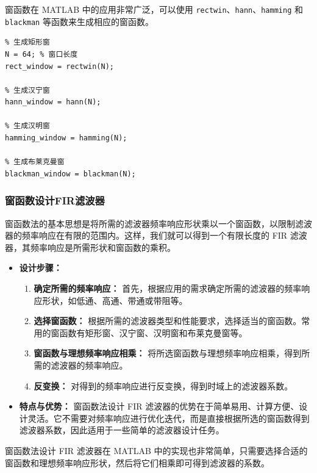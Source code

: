 \documentclass[a4paper,12pt]{article}
\begin{document}
窗函数在 MATLAB 中的应用非常广泛，可以使用 \texttt{rectwin}、\texttt{hann}、\texttt{hamming} 和 \texttt{blackman} 等函数来生成相应的窗函数。
\begin{lstlisting}
% 生成矩形窗
N = 64; % 窗口长度
rect_window = rectwin(N);

% 生成汉宁窗
hann_window = hann(N);

% 生成汉明窗
hamming_window = hamming(N);

% 生成布莱克曼窗
blackman_window = blackman(N);

\end{lstlisting}

\subsubsection{窗函数设计FIR滤波器}
窗函数法的基本思想是将所需的滤波器频率响应形状乘以一个窗函数，以限制滤波器的频率响应在有限的范围内。这样，我们就可以得到一个有限长度的 FIR 滤波器，其频率响应是所需形状和窗函数的乘积。

\begin{itemize}    
    \item \textbf{设计步骤：}
        \begin{enumerate}
            \item \textbf{确定所需的频率响应：} 首先，根据应用的需求确定所需的滤波器的频率响应形状，如低通、高通、带通或带阻等。
            
            \item \textbf{选择窗函数：} 根据所需的滤波器类型和性能要求，选择适当的窗函数。常用的窗函数有矩形窗、汉宁窗、汉明窗和布莱克曼窗等。
            
            \item \textbf{窗函数与理想频率响应相乘：} 将所选窗函数与理想频率响应相乘，得到所需的滤波器的频率响应。
            
            \item \textbf{反变换：} 对得到的频率响应进行反变换，得到时域上的滤波器系数。
        \end{enumerate}
    
    \item \textbf{特点与优势：} 窗函数法设计 FIR 滤波器的优势在于简单易用、计算方便、设计灵活。它不需要对频率响应进行优化迭代，而是直接根据所选的窗函数得到滤波器系数，因此适用于一些简单的滤波器设计任务。
\end{itemize}

窗函数法设计 FIR 滤波器在 MATLAB 中的实现也非常简单，只需要选择合适的窗函数和理想频率响应形状，然后将它们相乘即可得到滤波器的系数。
\end{document}

